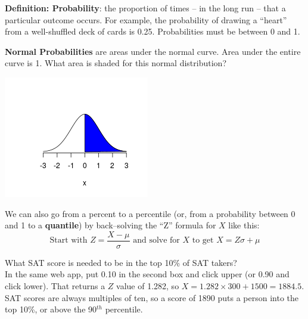 {\bf Definition:  Probability}: the proportion of times -- in the long run
-- that a particular outcome occurs.  For example, the probability of
drawing a ``heart'' from a well-shuffled deck of cards is
0.25. Probabilities must be between 0 and 1. 


\begin{minipage}{.80\linewidth}
{\bf Normal Probabilities} are areas under the normal curve.  Area
under the  entire curve is 1.   What area is shaded for this normal
distribution? \vspace*{2cm}
\end{minipage}
\includegraphics[width=.2\linewidth]{plots/halfNormal.png}
\vspace{-1.9cm}

We can also go from a percent to a percentile (or, from a probability
between 0 and 1 to a {\bf quantile}) by back--solving the ``Z'' formula for
$X$ like this:  
$$\mbox{Start with } Z = \frac{X-\mu}{\sigma}  \mbox{ and solve for
  $X$ to get }
  X = Z\sigma + \mu $$

What SAT score is needed to be in the top 10\% of SAT takers?\\
In the same web app, put 0.10 in the second box and click upper (or 0.90
and click lower). That returns a $Z$ value of 1.282, so 
$ X = 1.282 \times 300 + 1500 = 1884.5$.  SAT  scores are always
multiples of ten, so a score of 1890 puts a person into the top 10\%,
or above the 90$^{th}$ percentile. 

